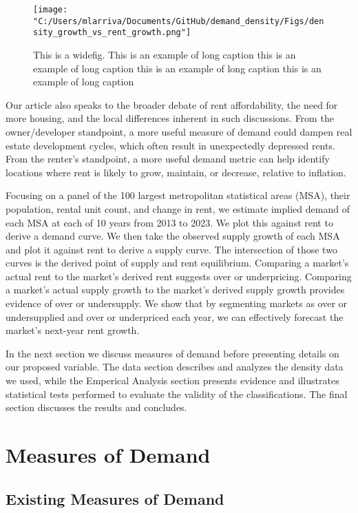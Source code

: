 \documentclass[sn-mathphys-num]{sn-jnl}%
\theoremstyle{thmstyleone}%
\theoremstyle{thmstyletwo}%
\theoremstyle{thmstylethree}%
\begin{document}
\begin{figure}[H]
	\centering
	\texttt{[image: "C:/Users/mlarriva/Documents/GitHub/demand\_density/Figs/density\_growth\_vs\_rent\_growth.png"]}
	\caption{This is a widefig. This is an example of long caption this is an example of long caption  this is an example of long caption this is an example of long caption}\label{fig1}
\end{figure}

Our article also speaks to the broader debate of rent affordability, the need for more housing, and the local differences inherent in such discussions. From the owner/developer standpoint, a more useful measure of demand could dampen real estate development cycles, which often result in unexpectedly depressed rents. From the renter's standpoint, a more useful demand metric can help identify locations where rent is likely to grow, maintain, or decrease, relative to inflation.  

Focusing on a panel of the 100 largest metropolitan statistical areas (MSA), their population, rental unit count, and change in rent, we estimate implied demand of each MSA at each of 10 years from 2013 to 2023. We plot this against rent to derive a demand curve. We then take the observed supply growth of each MSA and plot it against rent to derive a supply curve. The intersection of those two curves is the derived point of supply and rent equilibrium. Comparing a market's actual rent to the market's derived rent suggests over or underpricing. Comparing a market's actual supply growth to the market's derived supply growth provides evidence of over or undersupply. We show that by segmenting markets as over or undersupplied and over or underpriced each year, we can effectively forecast the market's next-year rent growth.  

In the next section we discuss measures of demand before presenting details on our proposed variable. The data section describes and analyzes the density data we used, while the Emperical Analysis section presents evidence and illustrates statistical tests performed to evaluate the validity of the classifications. The final section discusses the results and concludes. 
 
\section{Measures of Demand}
\subsection{Existing Measures of Demand}
\end{document}
